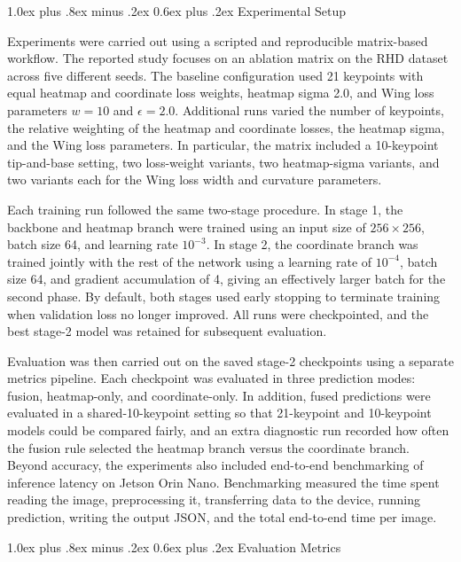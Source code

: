 \documentclass[10pt,letterpaper,twocolumn]{article}
\makeatletter
\renewcommand\subsection{\@startsection{subsection}{2}{\z@}%
  {1.0ex plus .8ex minus .2ex}%
  {0.6ex plus .2ex}%
  {\normalfont\itshape}}
\makeatother
\begin{document}
\subsection{Experimental Setup}

Experiments were carried out using a scripted and reproducible matrix-based workflow. The reported study focuses on an ablation matrix on the RHD dataset across five different seeds. The baseline configuration used 21 keypoints with equal heatmap and coordinate loss weights, heatmap sigma 2.0, and Wing loss parameters $w = 10$ and $\epsilon = 2.0$. Additional runs varied the number of keypoints, the relative weighting of the heatmap and coordinate losses, the heatmap sigma, and the Wing loss parameters. In particular, the matrix included a 10-keypoint tip-and-base setting, two loss-weight variants, two heatmap-sigma variants, and two variants each for the Wing loss width and curvature parameters.

Each training run followed the same two-stage procedure. In stage 1, the backbone and heatmap branch were trained using an input size of $256 \times 256$, batch size 64, and learning rate $10^{-3}$. In stage 2, the coordinate branch was trained jointly with the rest of the network using a learning rate of $10^{-4}$, batch size 64, and gradient accumulation of 4, giving an effectively larger batch for the second phase. By default, both stages used early stopping to terminate training when validation loss no longer improved. All runs were checkpointed, and the best stage-2 model was retained for subsequent evaluation.

Evaluation was then carried out on the saved stage-2 checkpoints using a separate metrics pipeline. Each checkpoint was evaluated in three prediction modes: fusion, heatmap-only, and coordinate-only. In addition, fused predictions were evaluated in a shared-10-keypoint setting so that 21-keypoint and 10-keypoint models could be compared fairly, and an extra diagnostic run recorded how often the fusion rule selected the heatmap branch versus the coordinate branch. Beyond accuracy, the experiments also included end-to-end benchmarking of inference latency on Jetson Orin Nano. Benchmarking measured the time spent reading the image, preprocessing it, transferring data to the device, running prediction, writing the output JSON, and the total end-to-end time per image.

\subsection{Evaluation Metrics}
\end{document}
